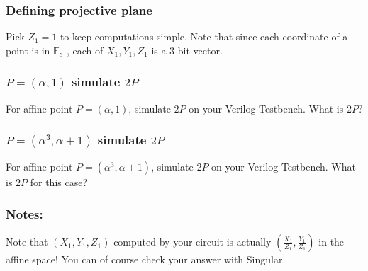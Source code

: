 \documentclass[a4paper,11pt]{exam}
\begin{document}
\subsubsection{Defining projective plane}
\label{sec:org8c7b61a}
Pick \(Z_1 = 1\) to keep computations simple. Note that since each coordinate of a point is
in \(\mathbb{F}_8\) , each of \(X_1, Y_1, Z_1\) is a 3-bit vector.

\subsubsection{\(P = (\alpha, 1)\) simulate \(2P\)}
\label{sec:org0bd8ecd}
For affine point \(P = (\alpha, 1)\), simulate \(2P\) on your Verilog Testbench. What is \(2P\)?
\subsubsection{\(P = (\alpha^3, \alpha + 1)\) simulate \(2P\)}
\label{sec:orgb2c67aa}
For affine point \(P = (\alpha^3, \alpha + 1)\), simulate \(2P\) on your Verilog Testbench. What is \(2P\) for
this case?
\subsubsection{Notes:}
\label{sec:org81d4b18}
Note that \((X_1 , Y_1 , Z_1 )\) computed by your circuit is actually \((\frac{X_1}{Z_1}, \frac{Y_1}{Z_1})\) in the affine
space! You can of course check your answer with Singular.
\end{document}
